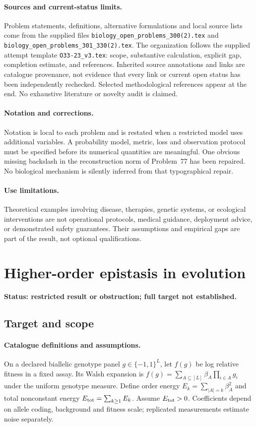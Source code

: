 \documentclass[11pt]{article}
\begin{document}
\paragraph{Sources and current-status limits.}
Problem statements, definitions, alternative formulations and local source lists
come from the supplied files
\texttt{biology\_open\_problems\_300(2).tex} and
\texttt{biology\_open\_problems\_301\_330(2).tex}.
The organization follows the supplied attempt template
\texttt{O33-23\_v3.tex}: scope, substantive calculation, explicit gap,
completion estimate, and references. Inherited source annotations and links are
catalogue provenance, not evidence that every link or current open status has
been independently rechecked. Selected methodological references appear at the
end. No exhaustive literature or novelty audit is claimed.

\paragraph{Notation and corrections.}
Notation is local to each problem and is restated when a restricted model uses
additional variables. A probability model, metric, loss and observation protocol
must be specified before its numerical quantities are meaningful. One obvious
missing backslash in the reconstruction norm of Problem~77 has been repaired.
No biological mechanism is silently inferred from that typographical repair.

\paragraph{Use limitations.}
Theoretical examples involving disease, therapies, genetic systems, or ecological
interventions are not operational protocols, medical guidance, deployment advice,
or demonstrated safety guarantees. Their assumptions and empirical gaps are part
of the result, not optional qualifications.


\section*{Higher-order epistasis in evolution}
\label{prob:143}
\noindent\textbf{Status: restricted result or obstruction; full target not established.}
\subsection{Target and scope}
\paragraph{Catalogue definitions and assumptions.}
On a declared biallelic genotype panel $g\in\{-1,1\}^L$, let $f(g)$ be log relative fitness in a fixed assay. Its Walsh expansion is $f(g)=\sum_{A\subseteq[L]}\beta_A\prod_{i\in A}g_i$ under the uniform genotype measure. Define order energy $E_k=\sum_{|A|=k}\beta_A^2$ and total nonconstant energy $E_{\rm tot}=\sum_{k\geq1}E_k$. Assume $E_{\rm tot}>0$. Coefficients depend on allele coding, background and fitness scale; replicated measurements estimate noise separately.
\end{document}
